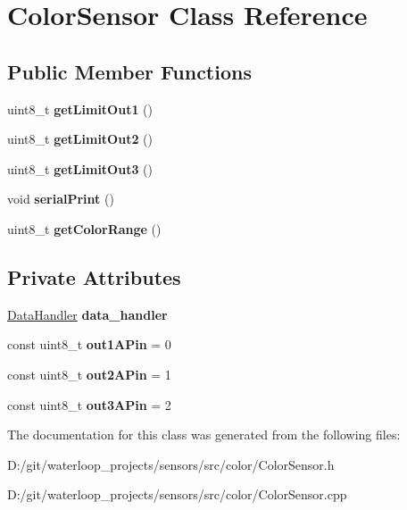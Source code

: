 \hypertarget{class_color_sensor}{}\section{Color\+Sensor Class Reference}
\label{class_color_sensor}
\subsection*{Public Member Functions}
\begin{DoxyCompactItemize}
\item 
\mbox{\label{class_color_sensor_abbfa4345d8bf99c678b18eaeb403b664}} 
uint8\+\_\+t {\bfseries get\+Limit\+Out1} ()
\item 
\mbox{\label{class_color_sensor_a36cd85a21cf109370a70b9a8fffd4ab4}} 
uint8\+\_\+t {\bfseries get\+Limit\+Out2} ()
\item 
\mbox{\label{class_color_sensor_a5c6e7edefc65eb7168a7a492859fe60f}} 
uint8\+\_\+t {\bfseries get\+Limit\+Out3} ()
\item 
\mbox{\label{class_color_sensor_ae02cce1bae8ec72fe9b42db145547999}} 
void {\bfseries serial\+Print} ()
\item 
\mbox{\label{class_color_sensor_af8e4739cb9108a94335aff275c519e2f}} 
uint8\+\_\+t {\bfseries get\+Color\+Range} ()
\end{DoxyCompactItemize}
\subsection*{Private Attributes}
\begin{DoxyCompactItemize}
\item 
\mbox{\label{class_color_sensor_a789c6ec0119caae89c42b87f774c0156}} 
\hyperlink{class_data_handler}{Data\+Handler} {\bfseries data\+\_\+handler}
\item 
\mbox{\label{class_color_sensor_a9825dda850d7ed034112fc119b8818e6}} 
const uint8\+\_\+t {\bfseries out1\+A\+Pin} = 0
\item 
\mbox{\label{class_color_sensor_a700f3bfd343696d72adf516c04b5e1d8}} 
const uint8\+\_\+t {\bfseries out2\+A\+Pin} = 1
\item 
\mbox{\label{class_color_sensor_a0a3ffd4eda92a508608adb961e59ba98}} 
const uint8\+\_\+t {\bfseries out3\+A\+Pin} = 2
\end{DoxyCompactItemize}


The documentation for this class was generated from the following files\+:\begin{DoxyCompactItemize}
\item 
D\+:/git/waterloop\+\_\+projects/sensors/src/color/Color\+Sensor.\+h\item 
D\+:/git/waterloop\+\_\+projects/sensors/src/color/Color\+Sensor.\+cpp\end{DoxyCompactItemize}
